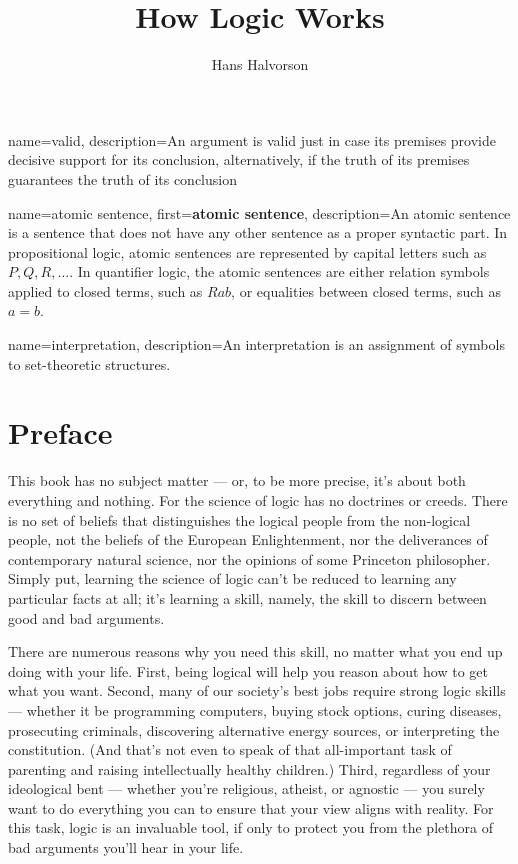 \documentclass[fleqn]{tufte-book}
\title{How Logic Works}
\author{Hans Halvorson}
\renewcommand{\emph}{\textbf}
\numberwithin{prop}{chapter}
\theoremstyle{definition}
\numberwithin{exercise}{chapter}
\begin{document}
\frontmatter

\maketitle

\tableofcontents

{
  name={valid},
  description={An argument is valid just in case its premises provide
    decisive support for its conclusion, alternatively, if the truth
    of its premises guarantees the truth of its conclusion} }

 { name={atomic sentence},
  first={\emph{atomic sentence}},
  description={An atomic sentence is a sentence that does not have any
    other sentence as a proper syntactic part.  In propositional
    logic, atomic sentences are represented by capital letters such as
    $P,Q,R,\dots $.  In quantifier logic, the atomic sentences are
    either relation symbols applied to closed terms, such as $Rab$, or equalities between closed terms, such as $a=b$.}
}


{
  name={interpretation},
  description={An interpretation is an assignment of symbols to set-theoretic structures.}
}


\chapter{Preface}

This book has no subject matter --- or, to be more precise, it's about
both everything and nothing.  For the science of logic has no
doctrines or creeds.  There is no set of beliefs that distinguishes
the logical people from the non-logical people, not the beliefs of the
European Enlightenment, nor the deliverances of contemporary natural
science, nor the opinions of some Princeton philosopher.  Simply put,
learning the science of logic can't be reduced to learning any
particular facts at all; it's learning a skill, namely, the skill to
discern between good and bad arguments.

There are numerous reasons why you need this skill, no matter what you
end up doing with your life.  First, being logical will help you
reason about how to get what you want.  Second, many of our society's
best jobs require strong logic skills --- whether it be programming
computers, buying stock options, curing diseases, prosecuting
criminals, discovering alternative energy sources, or interpreting the
constitution.  (And that's not even to speak of that all-important
task of parenting and raising intellectually healthy children.)
Third, regardless of your ideological bent --- whether you're
religious, atheist, or agnostic --- you surely want to do everything
you can to ensure that your view aligns with reality.  For this task,
logic is an invaluable tool, if only to protect you from the plethora
of bad arguments you'll hear in your life.
\end{document}
